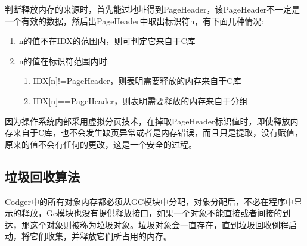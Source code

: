 判断释放内存的来源时，首先能过地址得到PageHeader，该PageHeader不一定是一个有效的数据，然后出PageHeader中取出标识符n，有下面几种情况:
\begin{enumerate}
\item n的值不在IDX的范围内，则可判定它来自于C库
\item n的值在标识符范围内时:
\begin{enumerate}
\item IDX[n]!=PageHeader，则表明需要释放的内存来自于C库
\item IDX[n]==PageHeader，则表明需要释放的内存来自于分组
\end{enumerate}
\end{enumerate}
因为操作系统内部采用虚拟分页技术，在掉取PageHeader标识值时，即使释放内存来自于C库，也不会发生缺页异常或者是内存错误，而且只是提取，没有赋值，原来的值不会有任何的更改，这是一个安全的过程。

\subsection{垃圾回收算法}
Codger中的所有对象内存都必须从GC模块中分配，对象分配后，不必在程序中显示的释放，Gc模块也没有提供释放接口，如果一个对象不能直接或者间接的到达，那这个对象则被称为垃圾对象。垃圾对象会一直存在，直到垃圾回收例程启动，将它们收集，并释放它们所占用的内存。
